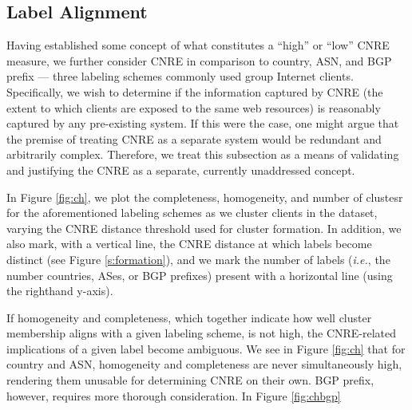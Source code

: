 \subsection{Label Alignment}
\label{s:labelalgn}

Having established some concept of what constitutes a ``high'' or
``low'' CNRE measure, we further consider CNRE in comparison to country, ASN,
and BGP prefix --- three labeling schemes commonly used group Internet clients.
Specifically, we wish to determine if the information captured by
CNRE (the extent to which clients are exposed to the same web resources) is
reasonably captured by any pre-existing system. If this were the case, one might
argue that the premise of treating CNRE as a separate system would be redundant
and arbitrarily complex. Therefore, we treat this subsection as a means of
validating and justifying the CNRE as a separate, currently unaddressed concept.

In Figure \ref{fig:ch}, we plot the completeness, homogeneity, and number of
clustesr for the aforementioned labeling schemes as we cluster clients in the
dataset, varying the CNRE distance threshold used for cluster formation. In
addition, we also mark, with a vertical line, the CNRE distance at which labels
become distinct (see Figure \ref{s:formation}), and we mark the number of labels
(\emph{i.e.}, the number countries, ASes, or BGP prefixes) present with a
horizontal line (using the righthand y-axis). 

If homogeneity and completeness, which together indicate how well cluster
membership aligns with a given labeling scheme, is not high, the CNRE-related
implications of a given label become ambiguous. We see in Figure \ref{fig:ch}
that for country and ASN, homogeneity and completeness are never simultaneously
high, rendering them unusable for determining CNRE on their own. BGP prefix,
however, requires more thorough consideration. In Figure \ref{fig:chbgp}

